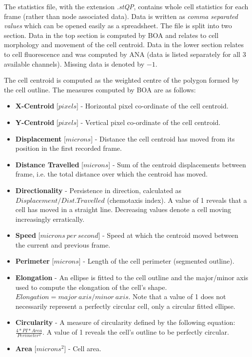 \documentclass[a4paper,12pt]{article}
\begin{document}
The statistics file, with the extension \textit{.stQP}, contains whole cell statistics for each frame (rather than node associated
data).  Data is written as \textit{comma separated values} which can be opened easily as a spreadsheet.  The file is split into
two section.  Data in the top section is computed by BOA and relates to cell morphology and movement of the cell centroid.
Data in the lower section relates to cell fluorescence and was computed
by ANA (data is listed separately for all 3 available channels). Missing data is denoted by $-1$.

The cell centroid is computed as the weighted centre of the polygon formed by the cell outline.
The measures computed by BOA are as follows:


\begin{itemize}

	\item \textbf{X-Centroid} [$pixels$] - Horizontal pixel co-ordinate of the cell centroid.

	\item \textbf{Y-Centroid} [$pixels$] - Vertical pixel co-ordinate of the cell centroid.
	
	\item \textbf{Displacement} [$microns$] - Distance the cell centroid has moved from its position in the first recorded frame. 
	
	\item \textbf{Distance Travelled} [$microns$] - Sum of the centroid displacements between frame, i.e. the total distance 
	over which the centroid has moved.
	
	\item \textbf{Directionality} - Persistence in direction, calculated as $Displacement / Dist. Travelled$ (chemotaxis index). A value of 1 reveals that
	a cell has moved in a straight line.  Decreasing values denote a cell moving increasingly erratically.
	
	\item \textbf{Speed} [$microns~per~second$] - Speed at which the centroid moved between the current and previous frame.
	
	 \item \textbf{Perimeter} [$microns$] - Length of the cell perimeter (segmented outline).
	  
	 \item \textbf{Elongation} - An ellipse is fitted to the cell outline and the major/minor axis used to compute the elongation of 
	 the cell's shape. $Elongation = major~axis / minor~axis$. Note that a value of 1 does not necessarily represent
	 a perfectly circular cell, only a circular fitted ellipse.
	 
	 \item \textbf{Circularity}  - A measure of circularity defined by the following equation:
	$\frac{4*PI*Area}{Perimeter^{2}}$. A value of 1 reveals the cell's outline to be perfectly circular.
	 
	 \item \textbf{Area} [$microns^{2}$] - Cell area.
	 
\end{itemize}
\end{document}
